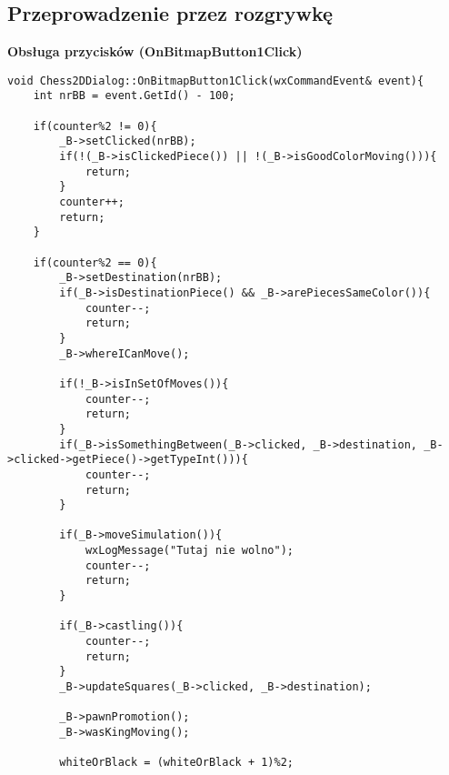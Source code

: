 \documentclass[]{report}
\begin{document}
\begin{flushleft}
\subsection*{Przeprowadzenie przez rozgrywkę}
\textbf{Obsługa przycisków (OnBitmapButton1Click)}
\begin{lstlisting}
void Chess2DDialog::OnBitmapButton1Click(wxCommandEvent& event){
	int nrBB = event.GetId() - 100;
	
	if(counter%2 != 0){
		_B->setClicked(nrBB);
		if(!(_B->isClickedPiece()) || !(_B->isGoodColorMoving())){
			return;
		}
		counter++;
		return;
	}
	
	if(counter%2 == 0){
		_B->setDestination(nrBB);
		if(_B->isDestinationPiece() && _B->arePiecesSameColor()){
			counter--;
			return;
		}
		_B->whereICanMove();
		
		if(!_B->isInSetOfMoves()){
			counter--;
			return;
		}
		if(_B->isSomethingBetween(_B->clicked, _B->destination, _B->clicked->getPiece()->getTypeInt())){
			counter--;
			return;
		}

		if(_B->moveSimulation()){
			wxLogMessage("Tutaj nie wolno");
			counter--;
			return;
		}

		if(_B->castling()){
			counter--;
			return;
		}
		_B->updateSquares(_B->clicked, _B->destination);
		
		_B->pawnPromotion();
		_B->wasKingMoving();
		
		whiteOrBlack = (whiteOrBlack + 1)%2;
		

\end{lstlisting}
\end{flushleft}
\end{document}
